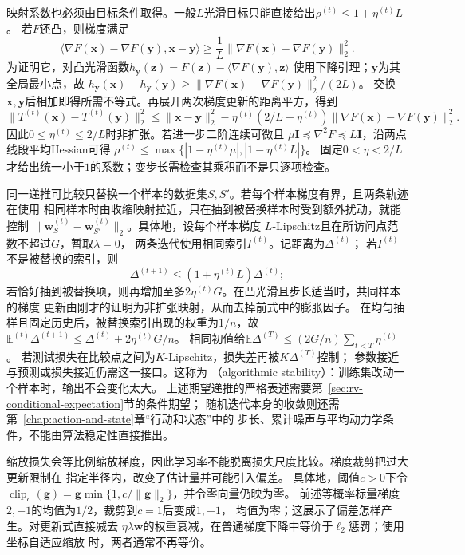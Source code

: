 映射系数也必须由目标条件取得。一般$L$光滑目标只能直接给出$\rho^{(t)}\leq1+\eta^{(t)}L$。
若$F$还凸，则梯度满足
\[
 \langle\nabla F(\bm x)-\nabla F(\bm y),\bm x-\bm y\rangle
 \geq\frac1L\|\nabla F(\bm x)-\nabla F(\bm y)\|_2^2.
\]
为证明它，对凸光滑函数$h_{\bm y}(\bm z)=F(\bm z)-\langle\nabla F(\bm y),\bm z\rangle$
使用下降引理；$\bm y$为其全局最小点，故
$h_{\bm y}(\bm x)-h_{\bm y}(\bm y)\geq
\|\nabla F(\bm x)-\nabla F(\bm y)\|_2^2/(2L)$。
交换$\bm x,\bm y$后相加即得所需不等式。再展开两次梯度更新的距离平方，得到
\[
 \|T^{(t)}(\bm x)-T^{(t)}(\bm y)\|_2^2
 \leq\|\bm x-\bm y\|_2^2
 -\eta^{(t)}(2/L-\eta^{(t)})\|\nabla F(\bm x)-\nabla F(\bm y)\|_2^2.
\]
因此$0\leq\eta^{(t)}\leq2/L$时非扩张。若进一步二阶连续可微且
$\mu\bm I\preceq\nabla^2F\preceq L\bm I$，沿两点线段平均Hessian可得
$\rho^{(t)}\leq\max\{|1-\eta^{(t)}\mu|,|1-\eta^{(t)}L|\}$。
固定$0<\eta<2/L$才给出统一小于$1$的系数；变步长需检查其乘积而不是只逐项检查。

同一递推可比较只替换一个样本的数据集$S,S'$。若每个样本梯度有界，且两条轨迹在使用
相同样本时由收缩映射拉近，只在抽到被替换样本时受到额外扰动，就能控制
$\lVert\bm{w}_S^{(t)}-\bm{w}_{S'}^{(t)}\rVert_2$。具体地，设每个样本梯度
$L$-Lipschitz且在所访问点范数不超过$G$，暂取$\lambda=0$，
两条迭代使用相同索引$I^{(t)}$。记距离为$\Delta^{(t)}$；
若$I^{(t)}$不是被替换的索引，则
\[
  \Delta^{(t+1)}\leq(1+\eta^{(t)}L)\Delta^{(t)};
\]
若恰好抽到被替换项，则再增加至多$2\eta^{(t)}G$。在凸光滑且步长适当时，共同样本的梯度
更新由刚才的证明为非扩张映射，从而去掉前式中的膨胀因子。
在均匀抽样且固定历史后，被替换索引出现的权重为$1/n$，故
$\mathbb E^{(t)}\Delta^{(t+1)}\leq\Delta^{(t)}+2\eta^{(t)}G/n$。
相同初值给$\mathbb E\Delta^{(T)}\leq(2G/n)\sum_{t<T}\eta^{(t)}$。
若测试损失在比较点之间为$K$-Lipschitz，损失差再被$K\Delta^{(T)}$控制；
参数接近与预测或损失接近仍需这一接口。这称为
（algorithmic stability）：训练集改动一个样本时，输出不会变化太大。
上述期望递推的严格表述需要第~\ref{sec:rv-conditional-expectation}节的条件期望；
随机迭代本身的收敛则还需第~\ref{chap:action-and-state}章“行动和状态”中的
步长、累计噪声与平均动力学条件，不能由算法稳定性直接推出。

缩放损失会等比例缩放梯度，因此学习率不能脱离损失尺度比较。梯度裁剪把过大更新限制在
指定半径内，改变了估计量并可能引入偏差。
具体地，阈值$c>0$下令
$\operatorname{clip}_c(\bm g)=\bm g\min\{1,c/\|\bm g\|_2\}$，并令零向量仍映为零。
前述等概率标量梯度$2,-1$的均值为$1/2$，裁剪到$c=1$后变成$1,-1$，
均值为零；这展示了偏差怎样产生。对更新式直接减去
$\eta\lambda\bm{w}$的权重衰减，在普通梯度下降中等价于$\ell_2$惩罚；使用坐标自适应缩放
时，两者通常不再等价。

